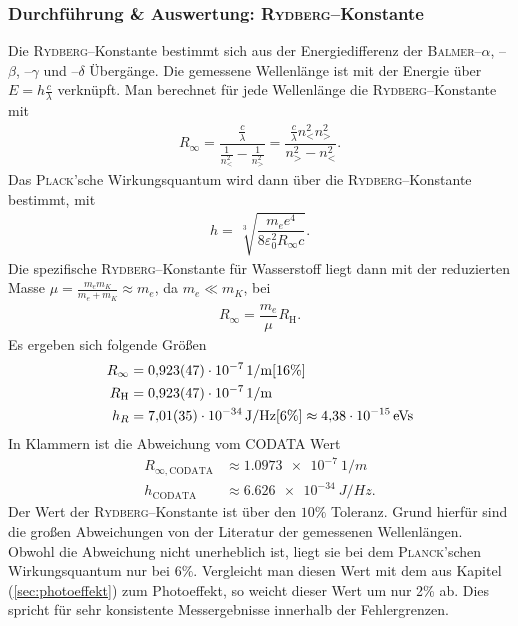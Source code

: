 \documentclass[sn-mathphys-num,iicol]{sn-jnl}
\theoremstyle{thmstyleone}
\theoremstyle{thmstyletwo}
\theoremstyle{thmstylethree}
\begin{document}
\subsubsection{Durchführung \& Auswertung: \textsc{Rydberg}--Konstante}
Die \textsc{Rydberg}--Konstante bestimmt sich aus der Energiedifferenz der \textsc{Balmer}--$\alpha $, --$\beta $, --$\gamma $ und --$\delta $ Übergänge.
Die gemessene Wellenlänge ist mit der Energie über $E=h\tfrac{c}{\lambda }$ verknüpft.
Man berechnet für jede Wellenlänge die \textsc{Rydberg}--Konstante mit
\begin{align} 
        R_\infty=\dfrac{\tfrac{c}{\lambda }}{\tfrac{1}{n_<^2}-\tfrac{1}{n_>^2}}=\dfrac{\tfrac{c}{\lambda }n_<^2n_>^2}{n_>^2-n_<^2}
.\end{align} 
Das \textsc{Plack}'sche Wirkungsquantum wird dann über die \textsc{Rydberg}--Konstante bestimmt, mit
\begin{align} 
        h=\,\sqrt[3]{\dfrac{m_e e^4}{8\varepsilon _0^2R_\infty c}}
.\end{align} 
Die spezifische \textsc{Rydberg}--Konstante für Wasserstoff liegt dann mit der reduzierten Masse $\mu =\tfrac{m_em_K}{m_e+m_K}\approx m_e$, da $m_e\ll m_K$, bei
\begin{align} 
        R_\infty=\dfrac{m_e}{\mu }R_\text{H}
.\end{align} 
Es ergeben sich folgende Größen
\begin{align} 
        R_\infty&=\SI{0.923+-0.047e-7}{1/m}[16\%]\\
        R_\text{H}&=\SI{0.923+-0.047e-7}{1/m}\\
        h_R&=\SI{7.01+-0.35e-34}{J/Hz}[6\%]\approx \SI{4.38e-15}{eVs}
\end{align} 
In Klammern ist die Abweichung vom CODATA\cite{CODATA} Wert
\begin{align} 
        R_{\infty,\text{CODATA}}&\approx \SI{1.0973e-7}{1/m}\\
        h_\text{CODATA}&\approx \SI{6.626e-34}{J/Hz}
.\end{align} 
Der Wert der \textsc{Rydberg}--Konstante ist über den $10\%$ Toleranz.
Grund hierfür sind die großen Abweichungen von der Literatur der gemessenen Wellenlängen.
Obwohl die Abweichung nicht unerheblich ist, liegt sie bei dem \textsc{Planck}'schen Wirkungsquantum nur bei $6\%$.
Vergleicht man diesen Wert mit dem aus Kapitel (\ref{sec:photoeffekt}) zum Photoeffekt, so weicht dieser Wert um nur 2\% ab.
Dies spricht für sehr konsistente Messergebnisse innerhalb der Fehlergrenzen.
\end{document}
